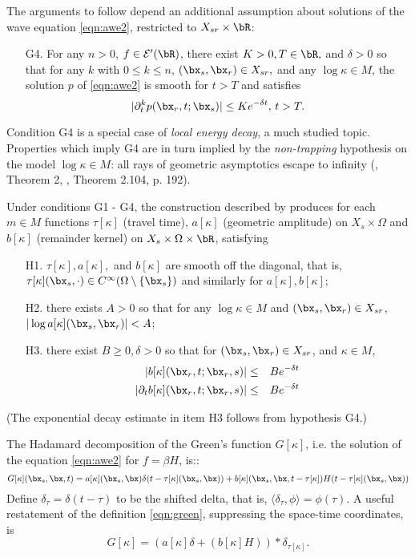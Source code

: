 The arguments to follow depend an additional assumption about solutions of
the wave equation \ref{eqn:awe2}, restricted to $X_{sr}\times \bR$:
\begin{itemize}
\item[G4. ] For any $n > 0$, $f \in {\cal E}'(\bR)$, there exist $K >
  0, T \in \bR,$ and $\delta>0$ so
  that for any $k$ with $0 \le k \le n$, $(\bx_s,\bx_r) \in
 X_{sr},$
  and any $\log \kappa \in M$, the solution $p$ of \ref{eqn:awe2} is smooth
  for $t>T$ and satisfies
  \[
    |\partial_t^k p(\bx_r,t;\bx_s)| \le K e^{-\delta t}, \, t > T.
  \]
\end{itemize}
Condition G4 is a special case of {\em local energy decay}, a much
studied topic. Properties which imply G4 are in turn implied by the
{\em non-trapping} hypothesis on the model $\log \kappa \in M$: all rays of
geometric asymptotics escape to infinity (\cite{Hristova:09}, Theorem
2, \cite{EgorovShubin}, Theorem 2.104, p. 192).

Under conditions G1 - G4, the construction described by
\cite{Friedlander:75} produces for each $m \in M$ functions $\tau[\kappa]$ (travel time), $a[\kappa]$
(geometric amplitude) on $X_s \times \Omega$ and $b[\kappa]$
(remainder kernel) on $X_s \times \Omega \times \bR$, satisfying
\begin{itemize}
\item[H1. ] $\tau[\kappa], a[\kappa],$ and $b[\kappa]$ are smooth off the diagonal,
that is, $\tau[\kappa](\bx_s,\cdot) \in C^{\infty}(\Omega \setminus \{\bx_s\})$
and similarly for $a[\kappa],b[\kappa]$;
\item[H2. ] there exists $A>0$ so that for any $\log \kappa \in M$
  and $(\bx_s,\bx_r) \in X_{sr}$,
  $|\log a[\kappa](\bx_s,\bx_r)| < A$;
\item[H3. ] there exist $B \ge 0,\delta > 0$ so that for
$(\bx_s,\bx_r) \in X_{sr}$, and $\kappa \in
M$,
\begin{eqnarray}
  |b[\kappa](\bx_r,t;\bx_r,s)| &\le& B e^{-\delta t} \nonumber \\
  |\partial_t b[\kappa](\bx_r,t;\bx_r,s)| &\le& B e^{-\delta t}
  \label{eqn:best}
\end{eqnarray}
\end{itemize}
(The exponential decay estimate in item H3 follows from hypothesis G4.)

The Hadamard
decomposition of the Green's function $G[\kappa]$, i.e. the solution of the
equation \ref{eqn:awe2} for $f = \beta H$, is::
\begin{equation}
  \label{eqn:green}
  G[\kappa](\bx_s,\bx,t) = a[\kappa](\bx_s,\bx)\delta(t - \tau[\kappa](\bx_s,\bx)) +
  b[\kappa](\bx_s,\bx,t-\tau[\kappa])H(t - \tau[\kappa](\bx_s,\bx))
\end{equation}
Define $\delta_{\tau} = \delta(t-\tau)$ to be the shifted delta, that
is, $\langle \delta_{\tau},\phi\rangle = \phi(\tau)$. A useful
restatement of the definition \ref{eqn:green}, suppressing the
space-time coordinates, is
\begin{equation}
  \label{eqn:regreen}
  G[\kappa] = (a[\kappa]\delta +  (b[\kappa]H))*\delta_{\tau[\kappa]}.
\end{equation}

